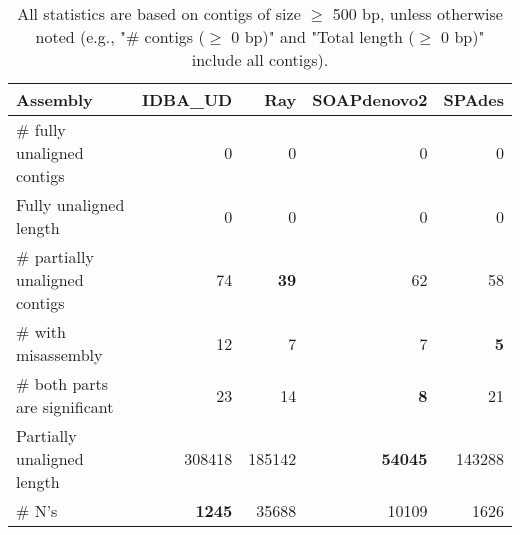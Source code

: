 \documentclass[12pt,a4paper]{article}
\begin{document}
\begin{table}[ht]
\begin{center}
\caption{All statistics are based on contigs of size $\geq$ 500 bp, unless otherwise noted (e.g., "\# contigs ($\geq$ 0 bp)" and "Total length ($\geq$ 0 bp)" include all contigs).}
\begin{tabular}{|l*{4}{|r}|}
\hline
Assembly & IDBA\_UD & Ray & SOAPdenovo2 & SPAdes \\ \hline
\# fully unaligned contigs & 0 & 0 & 0 & 0 \\ \hline
Fully unaligned length & 0 & 0 & 0 & 0 \\ \hline
\# partially unaligned contigs & 74 & {\bf 39} & 62 & 58 \\ \hline
\hspace{5mm}\# with misassembly & 12 & 7 & 7 & {\bf 5} \\ \hline
\hspace{5mm}\# both parts are significant & 23 & 14 & {\bf 8} & 21 \\ \hline
Partially unaligned length & 308418 & 185142 & {\bf 54045} & 143288 \\ \hline
\# N's & {\bf 1245} & 35688 & 10109 & 1626 \\ \hline
\end{tabular}
\end{center}
\end{table}
\end{document}
